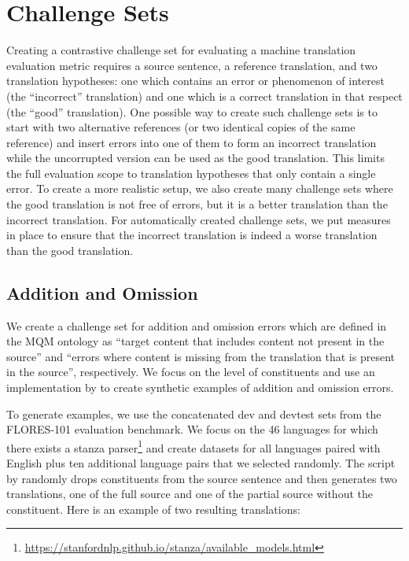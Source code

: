 \documentclass[11pt]{article}
\begin{document}
\section{Challenge Sets}
\label{sec:challengesets}
Creating a contrastive challenge set for evaluating a machine translation evaluation metric requires a source sentence, a reference translation, and two translation hypotheses: one which contains an error or phenomenon of interest (the ``incorrect'' translation) and one which is a correct translation in that respect (the ``good'' translation). One possible way to create such challenge sets is to start with two alternative references (or two identical copies of the same reference) and insert errors into one of them to form an incorrect translation while the uncorrupted version can be used as the good translation. This limits the full evaluation scope to translation hypotheses that only contain a single error. To create a more realistic setup, we also create many challenge sets where the good translation is not free of errors, but it is a better translation than the incorrect translation. For automatically created challenge sets, we put measures in place to ensure that the incorrect translation is indeed a worse translation than the good translation.


\subsection{Addition and Omission}
\label{sec:addition-omission}
We create a challenge set for addition and omission errors which are defined in the MQM ontology as ``target content that includes content not present in the source'' and ``errors where content is missing from the translation that is present in the source'', respectively. We focus on the level of constituents and use an implementation by \citet{vamvas-sennrich-2022-little} to create synthetic examples of addition and omission errors.

To generate examples, we use the concatenated dev and devtest sets from the FLORES-101 evaluation benchmark. We focus on the 46 languages for which there exists a stanza parser\footnote{\url{https://stanfordnlp.github.io/stanza/available_models.html}} and create datasets for all languages paired with English plus ten additional language pairs that we selected randomly. The script by \citet{vamvas-sennrich-2022-little} randomly drops constituents from the source sentence and then generates two translations, one of the full source and one of the partial source without the constituent. Here is an example of two resulting translations:
\end{document}
